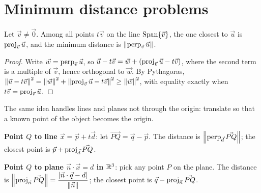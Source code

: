 \begin{center}
\end{center}

\section{Minimum distance problems}

\begin{theorem}
Let $\vec v\ne\vec0$. Among all points $t\vec v$ on the line $\operatorname{Span}\{\vec v\}$, the one closest to
$\vec u$ is $\operatorname{proj}_{\vec v}\vec u$, and the minimum distance is $\left\lVert \operatorname{perp}_{\vec v}\vec u \right\rVert$.
\end{theorem}
\begin{proof}
Write $\vec w=\operatorname{perp}_{\vec v}\vec u$, so $\vec u - t\vec v = \vec w + (\operatorname{proj}_{\vec v}\vec u-t\vec v)$, where
the second term is a multiple of $\vec v$, hence orthogonal to $\vec w$. By Pythagoras,
$\left\lVert \vec u - t\vec v \right\rVert^2 = \left\lVert \vec w \right\rVert^2 + \left\lVert \operatorname{proj}_{\vec v}\vec u - t\vec v \right\rVert^2\ge\left\lVert \vec w \right\rVert^2$,
with equality exactly when $t\vec v=\operatorname{proj}_{\vec v}\vec u$.
\end{proof}

The same idea handles lines and planes not through the origin: translate so that a known
point of the object becomes the origin.

\begin{important}[Recipes]
\textbf{Point $Q$ to line $\vec x=\vec p+t\vec d$}: let $\vec{PQ}=\vec q-\vec p$. The distance is
$\left\lVert \operatorname{perp}_{\vec d}\vec{PQ} \right\rVert$; the closest point is $\vec p+\operatorname{proj}_{\vec d}\vec{PQ}$.

\textbf{Point $Q$ to plane $\vec n\cdot\vec x = d$ in $\mathbb{R}^3$}: pick any point $P$ on the plane.
The distance is $\left\lVert \operatorname{proj}_{\vec n}\vec{PQ} \right\rVert = \dfrac{\left\lvert \vec n\cdot\vec q - d \right\rvert}{\left\lVert \vec n \right\rVert}$;
the closest point is $\vec q - \operatorname{proj}_{\vec n}\vec{PQ}$.
\end{important}

